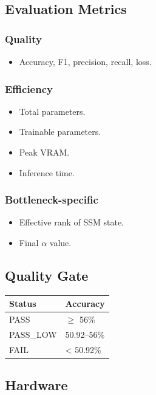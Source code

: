 \subsection{Evaluation Metrics}

\subsubsection{Quality}
\begin{itemize}
\item Accuracy, F1, precision, recall, loss.

\end{itemize}
\subsubsection{Efficiency}
\begin{itemize}
\item Total parameters.
\item Trainable parameters.
\item Peak VRAM.
\item Inference time.

\end{itemize}
\subsubsection{Bottleneck-specific}
\begin{itemize}
\item Effective rank of SSM state.
\item Final $\alpha$ value.

\end{itemize}
\subsection{Quality Gate}

\begin{table}[H]
\centering
\small
\begin{tabular}{ll}
\toprule
\textbf{Status} & \textbf{Accuracy} \\
\midrule
PASS & $\ge$ 56\% \\
PASS\_LOW & 50.92--56\% \\
FAIL & \textless{} 50.92\% \\
\bottomrule
\end{tabular}
\end{table}

\subsection{Hardware}


